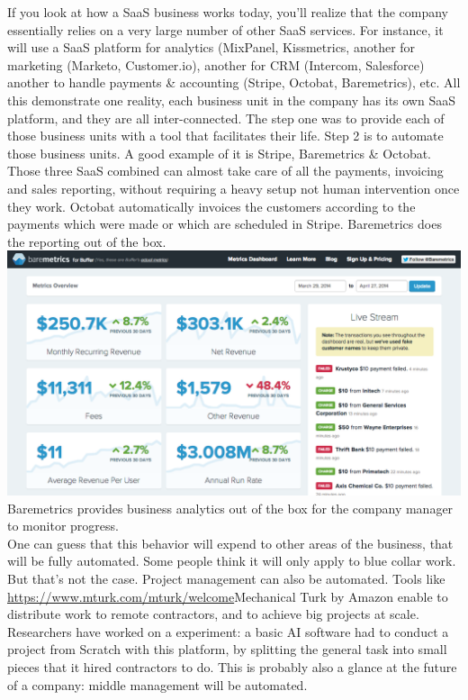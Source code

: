 \documentclass[12pt]{article}
\begin{document}
If you look at how a SaaS business works today, you'll realize that the company essentially relies on a very large number of other SaaS services. For instance, it will use a SaaS platform for analytics (MixPanel, Kissmetrics, another for marketing (Marketo, Customer.io), another for CRM (Intercom, Salesforce) another to handle payments & accounting (Stripe, Octobat, Baremetrics), etc. 
All this demonstrate one reality, each business unit in the company has its own SaaS platform, and they are all inter-connected. The step one was to provide each of those business units with a tool that facilitates their life. Step 2 is to automate those business units. A good example of it is Stripe, Baremetrics & Octobat. Those three SaaS combined can almost take care of all the payments, invoicing and sales reporting, without requiring a heavy setup not human intervention once they work. Octobat automatically invoices the customers according to the payments which were made or which are scheduled in Stripe. Baremetrics does the reporting out of the box.  
\\

\includegraphics[width=\textwidth]{baremetrics}
Baremetrics provides business analytics out of the box for the company manager to monitor progress. 
\\

One can guess that this behavior will expend to other areas of the business, that will be fully automated. Some people think it will only apply to blue collar work. But that's not the case. Project management can also be automated. Tools like \url{https://www.mturk.com/mturk/welcome}{Mechanical Turk} by Amazon enable to distribute work to remote contractors, and to achieve big projects at scale. Researchers have worked on a experiment: a basic AI software had to conduct a project from Scratch with this platform, by splitting the general task into small pieces that it hired contractors to do. This is probably also a glance at the future of a company: middle management will be automated. 
\\
\end{document}
